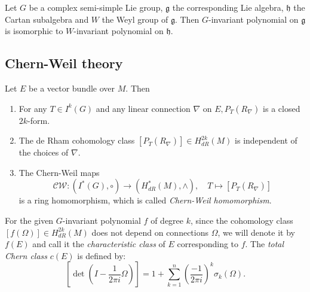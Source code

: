 \documentclass[11pt]{homework}
\begin{document}
\begin{theorem}
    Let $G$ be a complex semi-simple Lie group, $\mathfrak{g}$ the corresponding Lie algebra, $\mathfrak{h}$ the Cartan subalgebra and $W$ the Weyl group of $\mathfrak{g}$. 
    Then $G$-invariant polynomial on $\mathfrak{g}$ is isomorphic to $W$-invariant polynomial on $\mathfrak{h}$. 
\end{theorem}

\subsection{Chern-Weil theory}

\begin{theorem}
    Let $E$ be a vector bundle over $M .$ Then
    \begin{enumerate}
        \item For any $T \in I^{k}(G)$ and any linear connection $\nabla$ on $E, P_{T}\left(R_{\nabla}\right)$ is a closed $2 k$-form.
        \item The de Rham cohomology class $\left[P_{T}\left(R_{\nabla}\right)\right] \in H_{d R}^{2 k}(M)$ is independent of the choices of $\nabla$.
        \item The Chern-Weil maps
        \begin{equation*}
            \mathcal{C W}:\left(I^{*}(G), \circ\right) \rightarrow\left(H_{dR}^{*}(M), \wedge\right), \quad T \mapsto\left[P_{T}\left(R_{\nabla}\right)\right]
        \end{equation*}
        is a ring homomorphism, which is called \textit{Chern-Weil homomorphism}.
    \end{enumerate}
\end{theorem}

\begin{definition}
    For the given $G$-invariant polynomial $f$ of degree $k$, since the cohomology class $\left[f(\Omega)\right] \in H_{dR}^{2k}(M)$ does not depend on connections $\Omega$, we will denote it by $f(E)$ and call it the \textit{characteristic class} of $E$ corresponding to $f$. The \textit{total Chern class} $c(E)$ is defined by:
    \begin{equation*}
        \left[\det \left(I - \frac{1}{2\pi i}\Omega\right)\right] = 1 + \sum_{k=1}^n \left(\frac{-1}{2 \pi i}\right)^k \sigma_k (\Omega).
    \end{equation*}
\end{definition}
\end{document}
